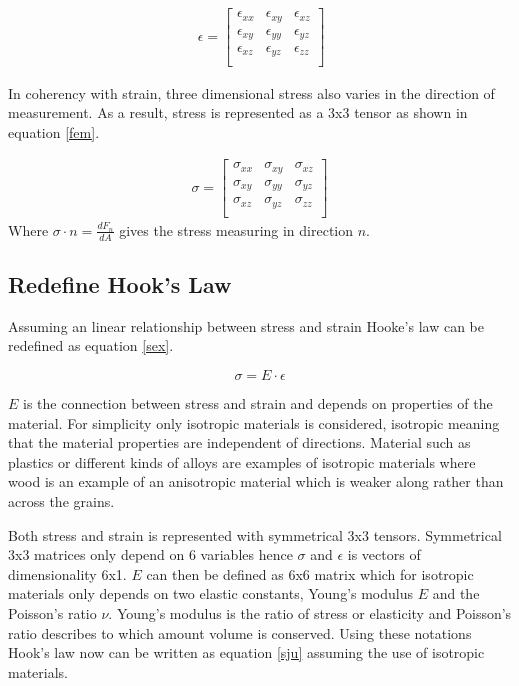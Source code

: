 \documentclass[10pt,a4paper]{article}
\begin{document}
\begin{eqnarray}\
\epsilon =  \left[ \begin{array}{cccc}
\epsilon_{xx} & \epsilon_{xy} & \epsilon_{xz} \\
\epsilon_{xy} & \epsilon_{yy} & \epsilon_{yz} \\
\epsilon_{xz} & \epsilon_{yz} & \epsilon_{zz} \\
 \end{array} \right]
\end{eqnarray}

In coherency with strain, three dimensional stress also varies in the direction of measurement. As a result, stress is represented as a 3x3 tensor as shown in equation \ref{fem}.

\begin{eqnarray}\label{fem}
\sigma =  \left[ \begin{array}{cccc}
\sigma_{xx} & \sigma_{xy} & \sigma_{xz} \\
\sigma_{xy} & \sigma_{yy} & \sigma_{yz} \\
\sigma_{xz} & \sigma_{yz} & \sigma_{zz} \\
 \end{array} \right]
\end{eqnarray}
Where $\sigma \cdot n = \frac{dF_{n}}{dA}$ gives the stress measuring in direction $n$.

\subsection{Redefine Hook's Law}
Assuming an linear relationship between stress and strain Hooke's law can be redefined as equation \ref{sex}.

\begin{equation}\label{sex}
    \sigma = E \cdot \epsilon
\end{equation}

 $E$ is the connection between stress and strain and depends on properties of the material. For simplicity only isotropic materials is considered, isotropic meaning that the material properties are independent of directions. Material such as plastics or different kinds of alloys are examples of isotropic materials where wood is an example of an anisotropic material which is weaker along rather than across the grains.

Both stress and strain is represented with symmetrical 3x3 tensors. Symmetrical 3x3 matrices only depend on 6 variables hence
$\sigma$ and $\epsilon$ is vectors of dimensionality 6x1. $E$ can then be defined as 6x6 matrix which for isotropic materials only depends on two elastic constants, Young's modulus $E$ and the Poisson's ratio $\nu$. Young's modulus is the ratio of stress or elasticity and Poisson's ratio describes to which amount volume is conserved. Using these notations Hook's law now can be written as equation \ref{sju} assuming the use of isotropic materials.
\end{document}
